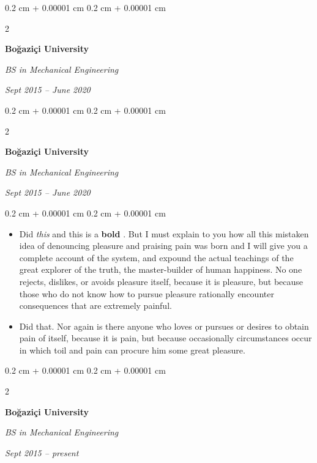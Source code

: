 \documentclass[10pt, letterpaper]{article}
\newenvironment{highlights}{
    \begin{itemize}[
        topsep=0.10 cm,
        parsep=0.10 cm,
        partopsep=0pt,
        itemsep=0pt,
        leftmargin=0.4 cm + 10pt
    ]
}{
    \end{itemize}
} %
\newenvironment{onecolentry}{
    \begin{adjustwidth}{
        0.2 cm + 0.00001 cm
    }{
        0.2 cm + 0.00001 cm
    }
}{
    \end{adjustwidth}
} %
\newenvironment{twocolentry}[2][]{
    \onecolentry
    \def\secondColumn{#2}
    \setcolumnwidth{\fill, 4.5 cm}
    \begin{paracol}{2}
}{
    \switchcolumn \raggedleft \secondColumn
    \end{paracol}
    \endonecolentry
} %
\let\hrefWithoutArrow\href
\renewcommand{\href}[2]{\hrefWithoutArrow{#1}{\ifthenelse{\equal{#2}{}}{ }{#2 }\raisebox{.15ex}{\footnotesize \faExternalLink*}}}
\begin{document}
        \vspace{0.2 cm}

        \begin{twocolentry}{
            
            
        \textit{Sept 2015 – June 2020}}
            \textbf{Boğaziçi University}

            \textit{BS in Mechanical Engineering}
        \end{twocolentry}



        \vspace{0.2 cm}

        \begin{twocolentry}{
            
            
        \textit{Sept 2015 – June 2020}}
            \textbf{Boğaziçi University}

            \textit{BS in Mechanical Engineering}
        \end{twocolentry}

        \vspace{0.10 cm}
        \begin{onecolentry}
            \begin{highlights}
                \item Did \textit{this} and this is a \textbf{bold} \href{https://example.com}{link}. But I must explain to you how all this mistaken idea of denouncing pleasure and praising pain was born and I will give you a complete account of the system, and expound the actual teachings of the great explorer of the truth, the master-builder of human happiness. No one rejects, dislikes, or avoids pleasure itself, because it is pleasure, but because those who do not know how to pursue pleasure rationally encounter consequences that are extremely painful.
                \item Did that. Nor again is there anyone who loves or pursues or desires to obtain pain of itself, because it is pain, but because occasionally circumstances occur in which toil and pain can procure him some great pleasure.
            \end{highlights}
        \end{onecolentry}


        \vspace{0.2 cm}

        \begin{twocolentry}{
            
            
        \textit{Sept 2015 – present}}
            \textbf{Boğaziçi University}

            \textit{BS in Mechanical Engineering}
        \end{twocolentry}
\end{document}
